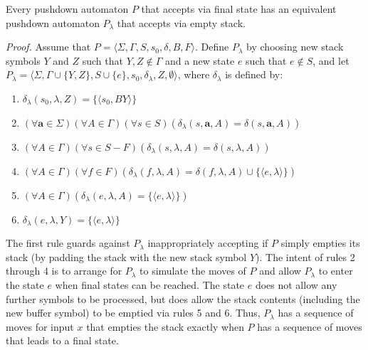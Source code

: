 \begin{thm}\label{thm-10.5}
Every pushdown automaton $P$ that accepts via final state has an equivalent
pushdown automaton $P_{\lambda}$ that accepts via empty stack.

\emph{Proof.} Assume that $P=\langle\Sigma,\Gamma,S,s_0,\delta,B,F\rangle$.
Define $P_{\lambda}$ by choosing new stack symbols $Y$ and $Z$ such that $Y,Z
\not \in\Gamma$ and a new state $e$ such that $e \not \in S$, and let $P_{\lambda}=
\langle\Sigma,\Gamma\cup\{Y,Z\},S\cup\{e\},s_0,\delta_{\lambda},Z,\emptyset
\rangle$, where $\delta_{\lambda}$ is defined by:
\begin{enumerate}
\item $\delta_{\lambda}(s_0,\lambda,Z) = \{\langle s_0,BY\rangle\}$
\item $(\forall \pmb{a}\in\Sigma)(\forall A\in\Gamma)(\forall s\in S)(\delta_{\lambda}
	(s,\pmb{a},A) = \delta(s,\pmb{a},A))$
\item $(\forall A\in\Gamma)(\forall s\in S-F)(\delta_{\lambda}(s,\lambda,A) =
	\delta(s,\lambda,A))$
\item $(\forall A\in\Gamma)(\forall f\in F)(\delta_{\lambda}(f,\lambda,A)
	=\delta(f,\lambda,A)\cup\{\langle e,\lambda\rangle\})$
\item $(\forall A\in\Gamma)(\delta_{\lambda}(e,\lambda,A) = \{\langle e,\lambda
	\rangle\})$
\item $\delta_{\lambda}(e,\lambda,Y) = \{\langle e,\lambda\rangle\}$
\end{enumerate}

The first rule guards against $P_{\lambda}$ inappropriately accepting if $P$
simply empties its stack (by padding the stack with the new stack symbol $Y$).
The intent of rules 2 through 4 is to arrange for $P_{\lambda}$ to simulate the
moves of $P$ and allow $P_{\lambda}$ to enter the state $e$ when final states
can be reached. The state $e$ does not allow any further symbols to be processed,
but does allow the stack contents (including the new buffer symbol) to be
emptied via rules 5 and 6. Thus, $P_{\lambda}$ has a sequence of moves for input
$x$ that empties the stack exactly when $P$ has a sequence of moves that leads
to a final state.


\end{thm}
